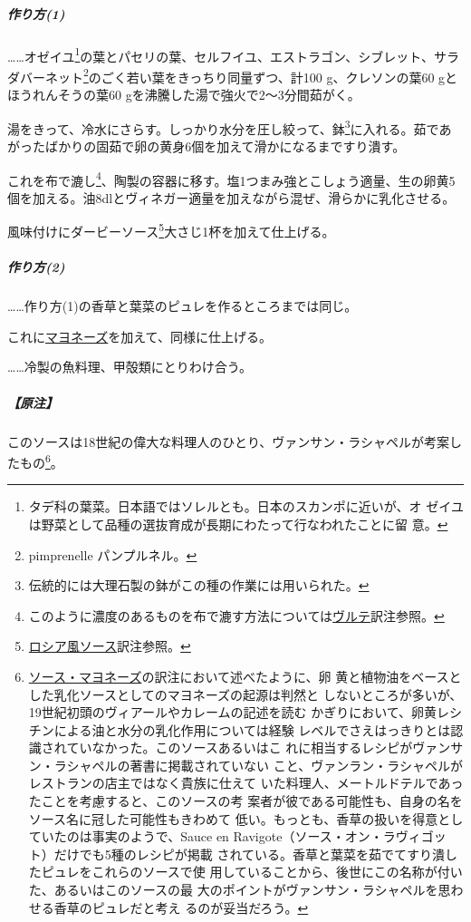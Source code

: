 \begin{recette}

\hypertarget{ux4f5cux308aux65b91}{%
\subparagraph{作り方(1)}\label{ux4f5cux308aux65b91}}

\ldots{}\ldots{}オゼイユ\footnote{タデ科の葉菜。日本語ではソレルとも。日本のスカンポに近いが、オ
  ゼイユは野菜として品種の選抜育成が長期にわたって行なわれたことに留
  意。}の葉とパセリの葉、セルフイユ、エストラゴン、シブレット、サラダバーネット\footnote{pimprenelle
  パンプルネル。}のごく若い葉をきっちり同量ずつ、計100 g、クレソンの葉60
gとほうれんそうの葉60 gを沸騰した湯で強火で2〜3分間茹がく。

湯をきって、冷水にさらす。しっかり水分を圧し絞って、鉢\footnote{伝統的には大理石製の鉢がこの種の作業には用いられた。}に入れる。茹であがったばかりの固茹で卵の黄身6個を加えて滑かになるまですり潰す。

これを布で漉し\footnote{このように濃度のあるものを布で漉す方法については\protect\hyperlink{veloute}{ヴルテ}訳注参照。}、陶製の容器に移す。塩1つまみ強とこしょう適量、生の卵黄5個を加える。油8dlとヴィネガー適量を加えながら混ぜ、滑らかに乳化させる。

風味付けにダービーソース\footnote{\protect\hyperlink{sauce-russe-froide}{ロシア風ソース}訳注参照。}大さじ1杯を加えて仕上げる。

\hypertarget{ux4f5cux308aux65b92}{%
\subparagraph{作り方(2)}\label{ux4f5cux308aux65b92}}

\ldots{}\ldots{}作り方(1)の香草と葉菜のピュレを作るところまでは同じ。

これに\protect\hyperlink{mayonnaise}{マヨネーズ}を加えて、同様に仕上げる。

\ldots{}\ldots{}冷製の魚料理、甲殻類にとりわけ合う。

\hypertarget{ux539fux6ce8-1}{%
\subparagraph{【原注】}\label{ux539fux6ce8-1}}

このソースは18世紀の偉大な料理人のひとり、ヴァンサン・ラシャペルが考案したもの\footnote{\protect\hyperlink{mayonnaise}{ソース・マヨネーズ}の訳注において述べたように、卵
  黄と植物油をベースとした乳化ソースとしてのマヨネーズの起源は判然と
  しないところが多いが、19世紀初頭のヴィアールやカレームの記述を読む
  かぎりにおいて、卵黄レシチンによる油と水分の乳化作用については経験
  レベルでさえはっきりとは認識されていなかった。このソースあるいはこ
  れに相当するレシピがヴァンサン・ラシャペルの著書に掲載されていない
  こと、ヴァンラン・ラシャペルがレストランの店主ではなく貴族に仕えて
  いた料理人、メートルドテルであったことを考慮すると、このソースの考
  案者が彼である可能性も、自身の名をソース名に冠した可能性もきわめて
  低い。もっとも、香草の扱いを得意としていたのは事実のようで、Sauce en
  Ravigote（ソース・オン・ラヴィゴット）だけでも5種のレシピが掲載
  されている。香草と葉菜を茹でてすり潰したピュレをこれらのソースで使
  用していることから、後世にこの名称が付いた、あるいはこのソースの最
  大のポイントがヴァンサン・ラシャペルを思わせる香草のピュレだと考え
  るのが妥当だろう。}。


\end{recette}
